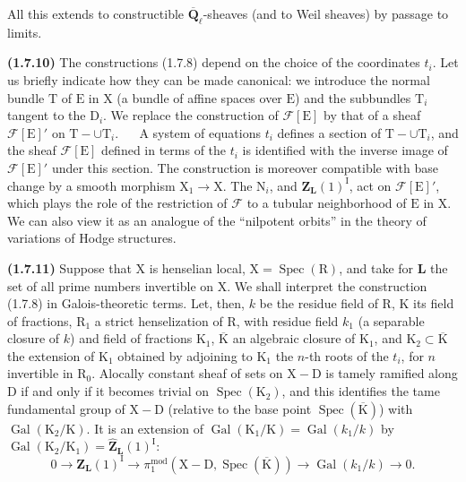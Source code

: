 \documentclass[11pt,leqno]{article}
\newcommand{\Page}[1]{\ifvmode\noindent\else\unskip\ \fi{\footnotesize\textcolor{gray}{[p.\,#1]}}\ \ignorespaces}
\begin{document}
All this extends to constructible \(\overline{\mathbf{Q}}_\ell\)-sheaves (and to Weil sheaves) by passage to limits.

\textbf{(1.7.10)} The constructions (1.7.8) depend on the choice of the coordinates \(t_i\). Let us briefly indicate how they can be made canonical: we introduce the normal bundle \(\mathrm{T}\) of \(\mathrm{E}\) in \(\mathrm{X}\) (a bundle of affine spaces over \(\mathrm{E}\)) and the subbundles \(\mathrm{T}_i\) tangent to the \(\mathrm{D}_i\). We replace the construction of \(\mathscr{F}[\mathrm{E}]\) by that of a sheaf \(\mathscr{F}[\mathrm{E}]'\) on \(\mathrm{T}-\cup\mathrm{T}_i\).
\Page{174}
A system of equations \(t_i\) defines a section of \(\mathrm{T}-\cup\mathrm{T}_i\), and the sheaf \(\mathscr{F}[\mathrm{E}]\) defined in terms of the \(t_i\) is identified with the inverse image of \(\mathscr{F}[\mathrm{E}]'\) under this section. The construction is moreover compatible with base change by a smooth morphism \(\mathrm{X}_1\to\mathrm{X}\). The \(\mathrm{N}_i\), and \(\mathbf{Z}_{\mathbf{L}}(1)^{\mathrm{I}}\), act on \(\mathscr{F}[\mathrm{E}]'\), which plays the role of the restriction of \(\mathscr{F}\) to a tubular neighborhood of \(\mathrm{E}\) in \(\mathrm{X}\). We can also view it as an analogue of the “nilpotent orbits” in the theory of variations of Hodge structures.

\textbf{(1.7.11)} Suppose that \(\mathrm{X}\) is henselian local, \(\mathrm{X}=\operatorname{Spec}(\mathrm{R})\), and take for \(\mathbf{L}\) the set of all prime numbers invertible on \(\mathrm{X}\). We shall interpret the construction (1.7.8) in Galois-theoretic terms. Let, then, \(k\) be the residue field of \(\mathrm{R}\), \(\mathrm{K}\) its field of fractions, \(\mathrm{R}_1\) a strict henselization of \(\mathrm{R}\), with residue field \(k_1\) (a separable closure of \(k\)) and field of fractions \(\mathrm{K}_1\), \(\overline{\mathrm{K}}\) an algebraic closure of \(\mathrm{K}_1\), and \(\mathrm{K}_2\subset\overline{\mathrm{K}}\) the extension of \(\mathrm{K}_1\) obtained by adjoining to \(\mathrm{K}_1\) the \(n\)-th roots of the \(t_i\), for \(n\) invertible in \(\mathrm{R}_0\). Alocally constant sheaf of sets on \(\mathrm{X}-\mathrm{D}\) is tamely ramified along \(\mathrm{D}\) if and only if it becomes trivial on \(\operatorname{Spec}(\mathrm{K}_2)\), and this identifies the tame fundamental group of \(\mathrm{X}-\mathrm{D}\) (relative to the base point \(\operatorname{Spec}(\overline{\mathrm{K}})\)) with \(\operatorname{Gal}(\mathrm{K}_2/\mathrm{K})\). It is an extension of \(\operatorname{Gal}(\mathrm{K}_1/\mathrm{K})=\operatorname{Gal}(k_1/k)\) by \(\operatorname{Gal}(\mathrm{K}_2/\mathrm{K}_1)=\widehat{\mathbf{Z}}_{\mathbf{L}}(1)^{\mathrm{I}}\):
\[
0\to\mathbf{Z}_{\mathbf{L}}(1)^{\mathrm{I}}
\to\pi_1^{\mathrm{mod}}(\mathrm{X}-\mathrm{D},\operatorname{Spec}(\overline{\mathrm{K}}))
\to\operatorname{Gal}(k_1/k)\to0.
\]
\end{document}
